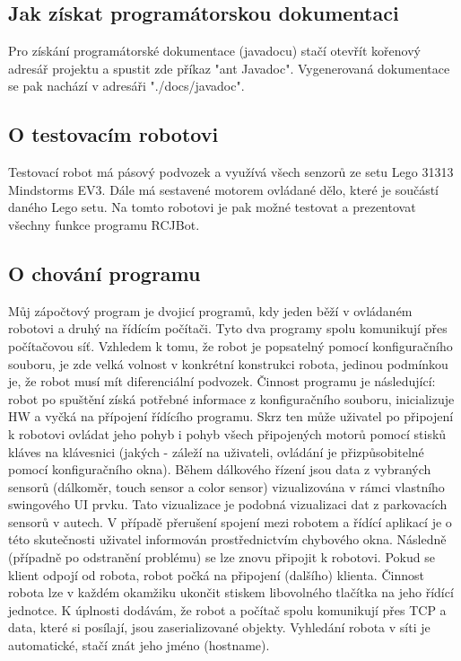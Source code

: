 \documentclass[12pt, ngerman]{article}
\begin{document}
\subsection{Jak získat programátorskou dokumentaci}
Pro získání programátorské dokumentace (javadocu) stačí otevřít kořenový adresář projektu a spustit zde příkaz "ant Javadoc". Vygenerovaná dokumentace se pak nachází v adresáři "./docs/javadoc".

\subsection{O testovacím robotovi}
Testovací robot má pásový podvozek a využívá všech senzorů ze setu Lego 31313 Mindstorms EV3. Dále má sestavené motorem ovládané dělo, které je součástí daného Lego setu. Na tomto robotovi je pak možné testovat a prezentovat všechny funkce programu RCJBot.

\subsection{O chování programu}
Můj zápočtový program je dvojicí programů, kdy jeden běží v ovládaném robotovi a druhý na řídícím počítači. Tyto dva programy spolu komunikují přes počítačovou síť. Vzhledem k tomu, že robot je popsatelný pomocí konfiguračního souboru, je zde velká volnost v konkrétní konstrukci robota, jedinou podmínkou je, že robot musí mít diferenciální podvozek. Činnost programu je následující: robot po spuštění získá potřebné informace z konfiguračního souboru, inicializuje HW a vyčká na přípojení řídícího programu. Skrz ten může uživatel po připojení k robotovi ovládat jeho pohyb i pohyb všech připojených motorů pomocí stisků kláves na klávesnici (jakých - záleží na uživateli, ovládání je přizpůsobitelné pomocí konfiguračního okna). Během dálkového řízení jsou data z vybraných sensorů (dálkoměr, touch sensor a color sensor) vizualizována v rámci vlastního swingového UI prvku. Tato vizualizace je podobná vizualizaci dat z parkovacích sensorů v autech. V případě přerušení spojení mezi robotem a řídící aplikací je o této skutečnosti uživatel informován prostřednictvím chybového okna. Následně (případně po odstranění problému) se lze znovu připojit k robotovi. Pokud se klient odpojí od robota, robot počká na připojení (dalšího) klienta. Činnost robota lze v každém okamžiku ukončit stiskem libovolného tlačítka na jeho řídící jednotce. K úplnosti dodávám, že robot a počítač spolu komunikují přes TCP a data, které si posílají, jsou zaserializované objekty. Vyhledání robota v síti je automatické, stačí znát jeho jméno (hostname).
\end{document}
